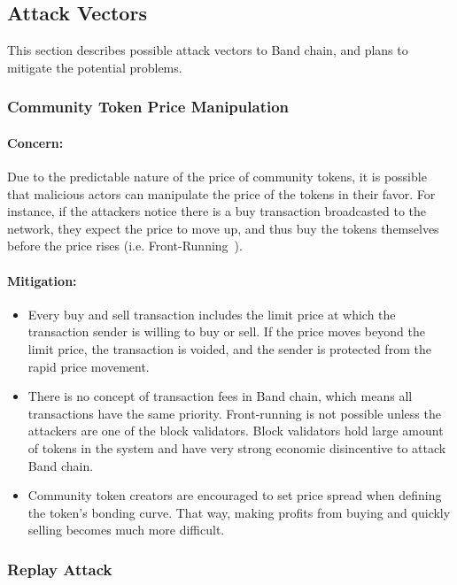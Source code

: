 \documentclass[letterpaper,11pt]{article}
\begin{document}
\subsection{Attack Vectors} \label{sec:attack-vector}
This section describes possible attack vectors to Band chain, and plans to mitigate the potential problems.

\subsubsection{Community Token Price Manipulation}
\paragraph{Concern:} Due to the predictable nature of the price of community tokens, it is possible that malicious actors can manipulate the price of the tokens in their favor. For instance, if the attackers notice there is a buy transaction broadcasted to the network, they expect the price to move up, and thus buy the tokens themselves before the price rises (i.e. Front-Running~\cite{pagano1993front}).

\paragraph{Mitigation:}

\begin{itemize}
\setlength\itemsep{0em}
\item Every buy and sell transaction includes the limit price at which the transaction sender is willing to buy or sell. If the price moves beyond the limit price, the transaction is voided, and the sender is protected from the rapid price movement.
\item There is no concept of transaction fees in Band chain, which means all transactions have the same priority. Front-running is not possible unless the attackers are one of the block validators. Block validators hold large amount of tokens in the system and have very strong economic disincentive to attack Band chain.
\item Community token creators are encouraged to set price spread when defining the token’s bonding curve. That way, making profits from buying and quickly selling becomes much more difficult.
\end{itemize}

\subsubsection{Replay Attack}
\end{document}
